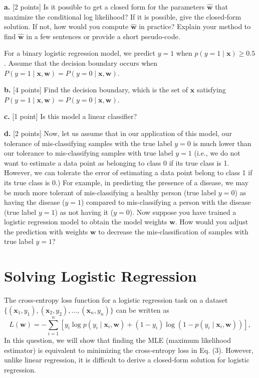 \documentclass[a3paper,12pt]{extarticle} %
\begin{document}
\noindent \textbf{a.} [2 points] Is it possible to get a closed form for the parameters \( \hat{\mathbf{w}} \) that maximize the conditional log likelihood? If it is possible, give the closed-form solution. If not, how would you compute \( \hat{\mathbf{w}} \) in practice? Explain your method to find \( \hat{\mathbf{w}} \) in a few sentences or provide a short pseudo-code.

For a binary logistic regression model, we predict \( y = 1 \) when \( p(y = 1 \mid \mathbf{x}) \geq 0.5 \). Assume that the decision boundary occurs when \( P(y = 1 \mid \mathbf{x}, \mathbf{w}) = P(y = 0 \mid \mathbf{x}, \mathbf{w}) \).

\noindent \textbf{b.} [4 points] Find the decision boundary, which is the set of $\mathbf{x}$ satisfying $P(y = 1 \mid \mathbf{x}, \mathbf{w}) = P(y = 0 \mid \mathbf{x}, \mathbf{w})$.

\noindent \textbf{c.} [1 point] Is this model a linear classifier?

\noindent \textbf{d.} [2 points] Now, let us assume that in our application of this model, our tolerance of mis-classifying samples with the true label $y = 0$ is much lower than our tolerance to mis-classifying samples with true label $y = 1$ (i.e., we do not want to estimate a data point as belonging to class 0 if its true class is 1. However, we can tolerate the error of estimating a data point belong to class 1 if its true class is 0.) For example, in predicting the presence of a disease, we may be much more tolerant of mis-classifying a healthy person (true label $y = 0$) as having the disease ($y = 1$) compared to mis-classifying a person with the disease (true label $y = 1$) as not having it ($y = 0$). Now suppose you have trained a logistic regression model to obtain the model weights $\mathbf{w}$. How would you adjust the prediction with weights $\mathbf{w}$ to decrease the mis-classification of samples with true label $y = 1$?

\newpage
\section{Solving Logistic Regression}
The cross-entropy loss function for a logistic regression task on a dataset \( \{(\mathbf{x}_1, y_1), (\mathbf{x}_2, y_2), \dots, (\mathbf{x}_n, y_n)\} \) can be written as
\[
L(\mathbf{w}) = -\sum_{i=1}^n \left[ y_i \log p(y_i \mid \mathbf{x}_i, \mathbf{w}) + (1 - y_i) \log (1 - p(y_i \mid \mathbf{x}_i, \mathbf{w})) \right],
\]
In this question, we will show that finding the MLE (maximum likelihood estimator) is equivalent to minimizing the cross-entropy loss in Eq. (3). However, unlike linear regression, it is difficult to derive a closed-form solution for logistic regression.
\end{document}
